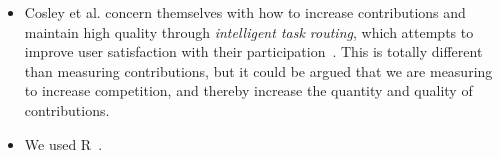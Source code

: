 \begin{itemize}

\item Cosley et al. concern themselves with how to increase contributions
	and maintain high quality through \textit{intelligent task routing},
	which attempts to improve user satisfaction with their
	participation~\cite{TaskRouting2006}.
	This is totally different than measuring contributions,
	but it could be argued that we are measuring to
	increase competition, and thereby increase the quantity and
	quality of contributions.  

\item We used R~\cite{R2007}.

\end{itemize}
